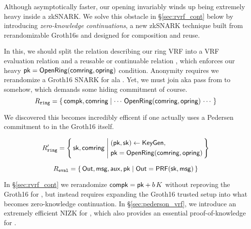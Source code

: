 Although asymptotically faster, our opening \OpenRing invariably
winds up being extremely heavy inside a zkSNARK.
We solve this obstacle in \S\ref{sec:rvrf_cont} below by introducing
{\em zero-knowledge continuations}, a new zkSNARK technique built from
rerandomizable Groth16s and designed for composition and reuse.

In this, we should split the relation describing our ring VRF into
a VRF evaluation relation \Reval and a reusable or continuable relation
\Rring, which enforces our heavy $\mathsf{pk} = {\mathsf{OpenRing}}(\mathsf{comring},\mathsf{opring})$
condition.  Anonymity requires we rerandomize a Groth16 SNARK for \Rring
ala \cite[Theorem 3, Appendix C, pp. 31]{RandomizationGroth16}.
%
Yet, we must join aka pass \pk from \Rring to \Reval somehow, which
demands some hiding commitment \compk of course.
%
$$ \Rring = \Setst{ \compk, \comring }{
    \cdots \, \eprint{ \pk =}{} \OpenRing(\comring,\openring) \, \cdots
} $$

We discovered this becomes incredibly efficent if one actually uses
a Pedersen commitment to \sk in the Groth16 itself.

$$ \Rring' = \Setst{ \sk, \comring }{
    \eprint{
    (\pk,\sk) \leftarrow \KeyGen, \quad %
    \pk = \OpenRing(\comring,\openring) 
    }{
    \begin{aligned}
        &(\pk,\sk) \leftarrow \KeyGen, \\
        &\pk = \OpenRing(\comring,\openring)  \\      
    \end{aligned}
    }
} $$

$$ \Reval = \Setst{ \Out, \msg, \aux, \pk }{ \Out = \PRF(\sk,\msg) } $$

In \S\ref{sec:rvrf_cont} we rerandomize $\mathsf{compk} = \mathsf{pk} + b \, K$
without reproving the Groth16 for \Rring, but instead requires
expanding the Groth16 trusted setup into what becomes zero-knowledge continuation.
%
In \S\ref{sec:pederson_vrf}, we introduce an extremely efficient NIZK
for \Reval, which also provides an essential proof-of-knowledge for \compk.




\endinput





Ring VRFs are firstly ring signatures broadly interpreted, in that they
prove an involved public key lies inside some commitment \comring to
the plausible signer set, known as the ring.
Anyone could compute \comring from this set of public keys.
%
At the same time, ring VRFs prove correct output of a PRF keyed by
the signer's actual secret key, and evaluated on a supplied message \msg,
which then links ring VRF signatures on the same \msg.

\smallskip
